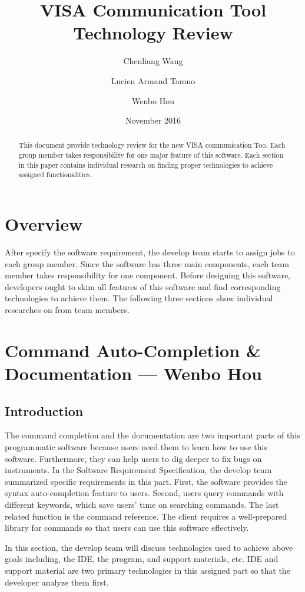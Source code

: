 \documentclass [10pt]{article}
\title{VISA Communication Tool Technology Review}
\author[1]{Chenliang Wang}
\author[1]{Lucien Armand Tamno}
\author[1]{Wenbo Hou}
\affil[1]{Oregon State University}
\date {November 2016}
\begin{document}
\begin{titlepage}
\maketitle
\begin{abstract}
This document provide technology review for the new VISA communication Too. Each group member takes responsibility for one major feature of this software. Each section in this paper contains individual research on finding proper technologies to achieve assigned functionalities.          
\end{abstract}
\end{titlepage}
\tableofcontents
\newpage
\section{Overview}
After specify the software requirement, the develop team starts to assign jobs to each group member. Since the software has three main components, each team member takes responsibility for one component. Before designing this software, developers ought to skim all features of this software and find corresponding technologies to achieve them. The following three sections show individual researches on from team members.   
\newpage
\section{Command Auto-Completion \& Documentation --- Wenbo Hou}
\subsection{Introduction}
The command completion and the documentation are two important parts of this programmatic software because users need them to learn how to use this software. Furthermore, they can help users to dig deeper to fix bugs on instruments. In the Software Requirement Specification, the develop team summarized specific requirements in this part. First, the software provides the syntax auto-completion feature to users. Second, users query commands with different keywords, which save users’ time on searching commands. The last related function is the command reference. The client requires a well-prepared library for commands so that users can use this software effectively. \par
In this section, the develop team will discuss technologies used to achieve above goals including, the IDE, the program, and support materials, etc. IDE and support material are two primary technologies in this assigned part so that the developer analyze them first. 
\end{document}
